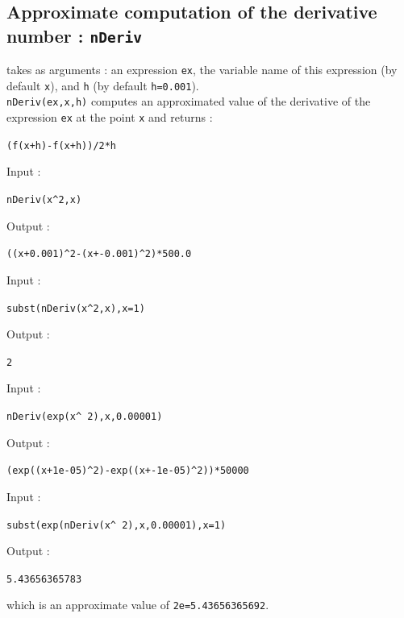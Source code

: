 \documentclass[a4paper,11pt]{book}
\begin{document}
\subsection{Approximate computation of the derivative  number : {\tt nDeriv}}
 takes as arguments : an expression {\tt ex}, the variable
name of this expression (by default {\tt x}), and {\tt h} (by default 
{\tt h=0.001}).\\
{\tt nDeriv(ex,x,h)} computes an approximated value of the derivative of the
expression {\tt ex} at the point {\tt x} and returns :
\begin{center}{\tt (f(x+h)-f(x+h))/2*h}\end{center}
Input :
\begin{center}{\tt nDeriv(x\verb|^|2,x)}\end{center}
Output :
\begin{center}{\tt ((x+0.001)\verb|^|2-(x+-0.001)\verb|^|2)*500.0}\end{center}
Input :
\begin{center}{\tt subst(nDeriv(x\verb|^|2,x),x=1)}\end{center}
Output :
\begin{center}{\tt 2}\end{center}
Input :
\begin{center}{\tt nDeriv(exp(x\verb|^| 2),x,0.00001)}\end{center}
Output :
\begin{center}{\tt (exp((x+1e-05)\verb|^|2)-exp((x+-1e-05)\verb|^|2))*50000}\end{center}
Input :
\begin{center}{\tt subst(exp(nDeriv(x\verb|^| 2),x,0.00001),x=1)}\end{center}
Output :
\begin{center}{\tt 5.43656365783}\end{center}
which is an approximate value of {\tt 2e=5.43656365692}.
\end{document}
